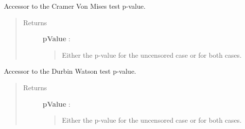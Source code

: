 \documentclass[letterpaper,10pt,english]{sphinxmanual}
\begin{document}
\begin{fulllineitems}
\begin{fulllineitems}
\end{fulllineitems}


\begin{fulllineitems}
\label{_generated/otpod.UnivariateLinearModelAnalysis:otpod.UnivariateLinearModelAnalysis.getCramerVonMisesPValue}
Accessor to the Cramer Von Mises test p-value.
\begin{quote}\begin{description}
\item[{Returns}] \leavevmode
\textbf{pValue} : \href{http://doc.openturns.org/openturns-latest/sphinx/user\_manual/\_generated/openturns.NumericalPoint.html\#openturns.NumericalPoint}{}
\begin{quote}

Either the p-value for the uncensored case or for both cases.
\end{quote}

\end{description}\end{quote}

\end{fulllineitems}


\begin{fulllineitems}
\label{_generated/otpod.UnivariateLinearModelAnalysis:otpod.UnivariateLinearModelAnalysis.getDurbinWatsonPValue}
Accessor to the Durbin Watson test p-value.
\begin{quote}\begin{description}
\item[{Returns}] \leavevmode
\textbf{pValue} : \href{http://doc.openturns.org/openturns-latest/sphinx/user\_manual/\_generated/openturns.NumericalPoint.html\#openturns.NumericalPoint}{}
\begin{quote}

Either the p-value for the uncensored case or for both cases.
\end{quote}

\end{description}\end{quote}

\end{fulllineitems}


\end{fulllineitems}
\end{document}
